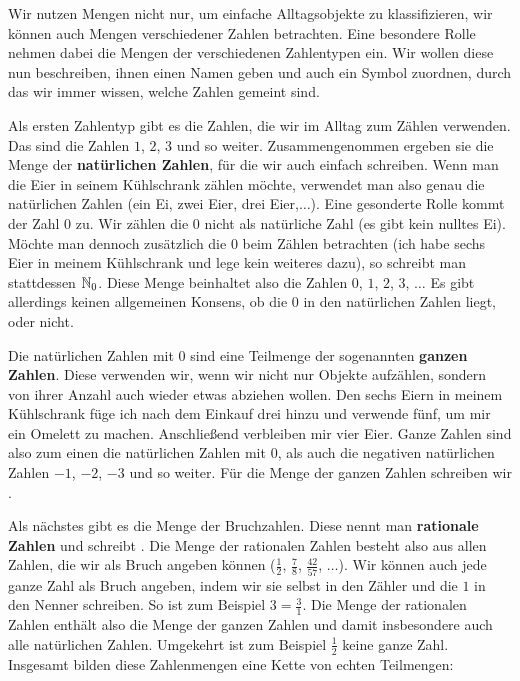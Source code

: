 \documentclass[../../main.tex]{subfiles}
\begin{document}
	\label{chapter:zahlenmengen}
	Wir nutzen Mengen nicht nur, um einfache Alltagsobjekte zu klassifizieren, wir können auch Mengen verschiedener Zahlen betrachten. Eine besondere Rolle nehmen dabei die Mengen der verschiedenen Zahlentypen ein. Wir wollen diese nun beschreiben, ihnen einen Namen geben und auch ein Symbol zuordnen, durch das wir immer wissen, welche Zahlen gemeint sind.
	
	Als ersten Zahlentyp gibt es die Zahlen, die wir im Alltag zum Zählen verwenden. Das sind die Zahlen $1$, $2$, $3$ und so weiter. Zusammengenommen ergeben sie die Menge der \textbf{natürlichen Zahlen}, für die wir auch einfach \Natural schreiben. Wenn man die Eier in seinem Kühlschrank zählen möchte, verwendet man also genau die natürlichen Zahlen (ein Ei, zwei Eier, drei Eier,$\ldots$). Eine gesonderte Rolle kommt der Zahl $0$ zu. Wir zählen die $0$ nicht als natürliche Zahl (es gibt kein nulltes Ei). Möchte man dennoch zusätzlich die $0$ beim Zählen betrachten (ich habe sechs Eier in meinem Kühlschrank und lege kein weiteres dazu), so schreibt man stattdessen $\mathbb{N}_0$. Diese Menge beinhaltet also die Zahlen $0$, $1$, $2$, $3$, $\ldots$ Es gibt allerdings keinen allgemeinen Konsens, ob die $0$ in den natürlichen Zahlen liegt, oder nicht.
	
	Die natürlichen Zahlen mit $0$ sind eine Teilmenge der sogenannten \textbf{ganzen Zahlen}. Diese verwenden wir, wenn wir nicht nur Objekte aufzählen, sondern von ihrer Anzahl auch wieder etwas abziehen wollen. Den sechs Eiern in meinem Kühlschrank füge ich nach dem Einkauf drei hinzu und verwende fünf, um mir ein Omelett zu machen. Anschließend verbleiben mir vier Eier. Ganze Zahlen sind also zum einen die natürlichen Zahlen mit $0$, als auch die negativen natürlichen Zahlen $-1$, $-2$, $-3$ und so weiter. Für die Menge der ganzen Zahlen schreiben wir \Integer.
	
	Als nächstes gibt es die Menge der Bruchzahlen. Diese nennt man \textbf{rationale Zahlen} und schreibt \Rational. Die Menge der rationalen Zahlen besteht also aus allen Zahlen, die wir als Bruch angeben können ($\frac{1}{2}$, $\frac{7}{8}$, $\frac{42}{57}$, $\ldots$). Wir können auch jede ganze Zahl als Bruch angeben, indem wir sie selbst in den Zähler und die $1$ in den Nenner schreiben. So ist zum Beispiel $3 = \frac{3}{1}$. Die Menge der rationalen Zahlen enthält also die Menge der ganzen Zahlen und damit insbesondere auch alle natürlichen Zahlen. Umgekehrt ist zum Beispiel $\frac{1}{2}$ keine ganze Zahl. Insgesamt bilden diese Zahlenmengen eine Kette von echten Teilmengen:
	
\end{document}
